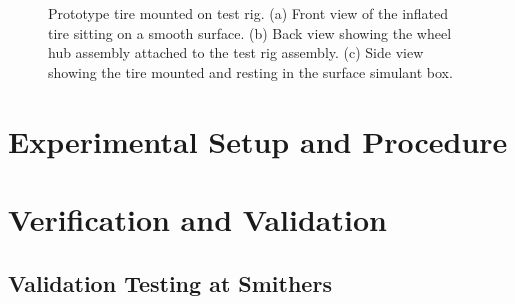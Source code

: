 \documentclass{article}
\begin{document}
\begin{figure}[hbt!]
\begin{minipage}{0.32\textwidth}
    \end{minipage}
        \begin{minipage}{0.32\textwidth}
        \centering
    \end{minipage}
    \caption{Prototype tire mounted on test rig. (a) Front view of the inflated tire sitting on a smooth surface. (b) Back view showing the wheel hub assembly attached to the test rig assembly. (c) Side view showing the tire mounted and resting in the surface simulant box.}
    \label{tire_on_rig}
\end{figure}

\section{Experimental Setup and Procedure}


\section{Verification and Validation}

\subsection{Validation Testing at Smithers}
\end{document}
